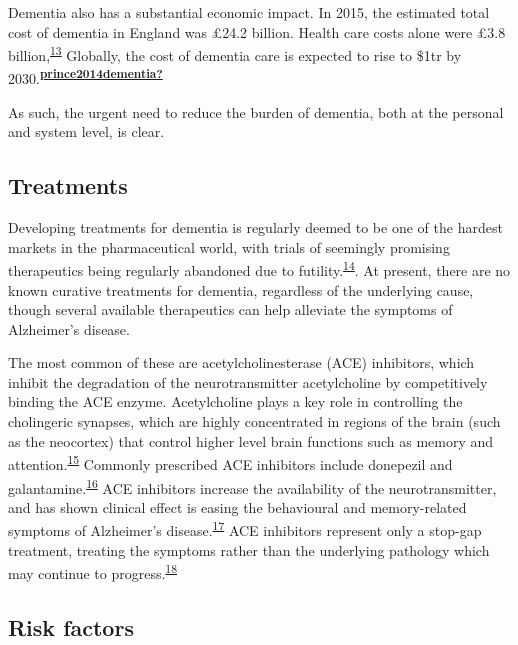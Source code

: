 \documentclass[a4paper, twoside]{templates/ociamthesis}
\begin{document}
Dementia also has a substantial economic impact. In 2015, the estimated total cost of dementia in England was £24.2 billion. Health care costs alone were £3.8 billion,\textsuperscript{\protect\hyperlink{ref-wittenberg2019}{13}} Globally, the cost of dementia care is expected to rise to \$1tr by 2030.\textsuperscript{\protect\hyperlink{ref-prince2014dementia}{\textbf{prince2014dementia?}}}

As such, the urgent need to reduce the burden of dementia, both at the personal and system level, is clear.

\hypertarget{intro-treatments}{%
\subsection{Treatments}\label{intro-treatments}}

Developing treatments for dementia is regularly deemed to be one of the hardest markets in the pharmaceutical world, with trials of seemingly promising therapeutics being regularly abandoned due to futility.\textsuperscript{\protect\hyperlink{ref-cummings2020}{14}}. At present, there are no known curative treatments for dementia, regardless of the underlying cause, though several available therapeutics can help alleviate the symptoms of Alzheimer's disease.

The most common of these are acetylcholinesterase (ACE) inhibitors, which inhibit the degradation of the neurotransmitter acetylcholine by competitively binding the ACE enzyme. Acetylcholine plays a key role in controlling the cholingeric synapses, which are highly concentrated in regions of the brain (such as the neocortex) that control higher level brain functions such as memory and attention.\textsuperscript{\protect\hyperlink{ref-hampel2018}{15}} Commonly prescribed ACE inhibitors include donepezil and galantamine.\textsuperscript{\protect\hyperlink{ref-pariente2008}{16}} ACE inhibitors increase the availability of the neurotransmitter, and has shown clinical effect is easing the behavioural and memory-related symptoms of Alzheimer's disease.\textsuperscript{\protect\hyperlink{ref-marucci2020}{17}} ACE inhibitors represent only a stop-gap treatment, treating the symptoms rather than the underlying pathology which may continue to progress.\textsuperscript{\protect\hyperlink{ref-francis2010}{18}}

\hypertarget{risk-factors}{%
\subsection{Risk factors}\label{risk-factors}}
\end{document}
